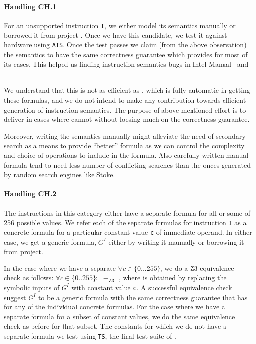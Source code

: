       
    \paragraph{Handling CH.1} For an unsupported instruction {\tt I}, we either
    model its semantics  manually or borrowed it from project \Stoke.   Once we
    have this candidate, we test it against hardware using {\tt ATS}.  Once the
    test passes we claim (from the above observation) the semantics to have the
    same correctness guarantee which \Strata provides for most of its cases. This helped us finding instruction semantics bugs in Intel Manual~\cite{BugIntel} and \Stoke~\cite{BugStoke983}.
    
    We understand that this is not as efficient as \Stoke, which is fully
    automatic in getting these formulas, and we do not intend to make any
    contribution towards efficient generation of instruction semantics. The
    purpose of above mentioned effort is to deliver in cases where \Stoke cannot
    without loosing much on the correctness guarantee. 
   
   Moreover, writing the semantics manually might alleviate the need of
   secondary search as a means to provide ``better'' formula as we can control
   the complexity and choice of operations to include in the formula. Also
   carefully written manual formula tend to need less number of conflicting
   searches than the onces generated by random search engines like Stoke.
   
   
   
   
   \paragraph{Handling CH.2} The instructions in this category either  have a
   separate formula for all or some of 256 possible values. We refer each of the
   separate formulas for instruction {\tt I} as a concrete formula  for
   a particular constant value {\tt c} of immediate operand.  In either case, we
   get a generic formula, $G^I$ either by writing it manually or borrowing it
   from  \Stoke project.
   
   In the case where we have a separate  $\forall c \in \{0...255\}$,
   we do a Z3 equivalence check as follows: $\forall c \in \{0..255\}:$
    $\equiv_\text{Z3}$ , where  is obtained by
   replacing the symbolic inputs of $G^I$ with constant value {\tt c}. A
   successful equivalence check suggest $G^I$ to be a generic formula with the
   same correctness guarantee that \Strata has for any of the individual
   concrete formulas. For the case where we have a separate formula for a subset
   of constant values, we do the same equivalence check as before for that
   subset. The constants for which we do not have a separate formula we test
    using {\tt TS}, the final test-suite of \Strata. 
    

